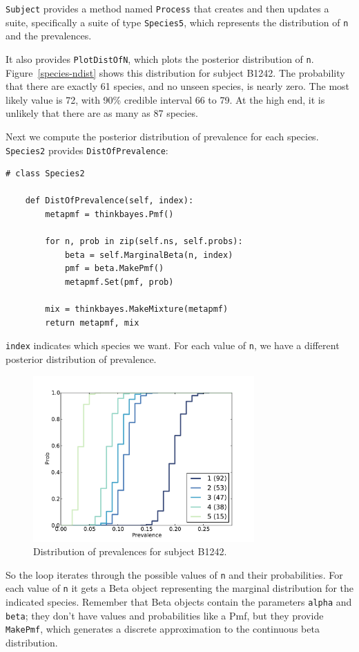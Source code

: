 \documentclass[12pt]{book}
\begin{document}
{\tt Subject} provides a method named {\tt Process} that creates and
then updates a suite, specifically a suite of type {\tt Species5},
which represents the distribution of {\tt n} and the prevalences.

It also provides {\tt PlotDistOfN}, which plots the posterior
distribution of {\tt n}.  Figure~\ref{species-ndist} shows this
distribution for subject B1242.  The probability that there are
exactly 61 species, and no unseen species, is nearly zero.  The most
likely value is 72, with 90\% credible interval 66 to 79.  At the high
end, it is unlikely that there are as many as 87 species.

Next we compute the posterior distribution of prevalence for
each species.  {\tt Species2} provides {\tt DistOfPrevalence}:

\begin{verbatim}
# class Species2

    def DistOfPrevalence(self, index):
        metapmf = thinkbayes.Pmf()

        for n, prob in zip(self.ns, self.probs):
            beta = self.MarginalBeta(n, index)
            pmf = beta.MakePmf()
            metapmf.Set(pmf, prob)

        mix = thinkbayes.MakeMixture(metapmf)
        return metapmf, mix
\end{verbatim}

{\tt index} indicates which species we want.  For each
value of {\tt n}, we have a different posterior distribution
of prevalence.  

\begin{figure}
\centerline{\includegraphics[height=2.5in]{figs/species-prev-B1242.pdf}}
\caption{Distribution of prevalences for subject B1242.}
\label{species-prev}
\end{figure}

So the loop iterates through the possible values of {\tt n}
and their probabilities.  For each value of {\tt n} it gets
a Beta object representing the marginal distribution for the
indicated species.  Remember that Beta objects contain the
parameters {\tt alpha} and {\tt beta}; they don't have
values and probabilities like a Pmf, but they provide {\tt MakePmf},
which generates a discrete approximation to the continuous
beta distribution.
\end{document}
